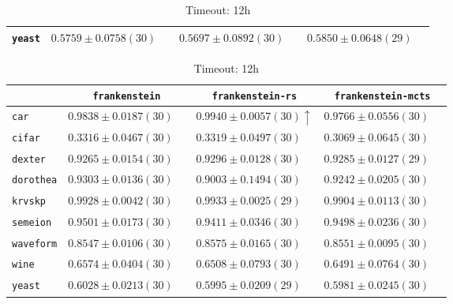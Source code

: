 \begin{table}[ht]
\begin{subtable}{\textwidth}
\begin{tabular}{l|ccc}
            \texttt{yeast} & $ 0.5759 \pm 0.0758 (30) \phantom{\downarrow}$ & $ 0.5697 \pm 0.0892 (30) \phantom{\downarrow}$ & $ \boldsymbol{0.5850} \pm 0.0648 (29) \phantom{\downarrow}$\\
            \hline
        \end{tabular}
    \end{subtable}
    \par\bigskip
    \begin{subtable}{\textwidth}
        \centering
        \caption{Timeout: 12h}
        \begin{tabular}{l|ccc}
            & \texttt{frankenstein}  & \texttt{frankenstein-rs}  & \texttt{frankenstein-mcts} \\
            \hline
            \texttt{car} & $ 0.9838 \pm 0.0187 (30) \phantom{\downarrow}$ & $ \boldsymbol{0.9940} \pm 0.0057 (30) \uparrow$ & $ 0.9766 \pm 0.0556 (30) \phantom{\downarrow}$\\
            \texttt{cifar} & $ 0.3316 \pm 0.0467 (30) \phantom{\downarrow}$ & $ \boldsymbol{0.3319} \pm 0.0497 (30) \phantom{\downarrow}$ & $ 0.3069 \pm 0.0645 (30) \phantom{\downarrow}$\\
            \texttt{dexter} & $ 0.9265 \pm 0.0154 (30) \phantom{\downarrow}$ & $ \boldsymbol{0.9296} \pm 0.0128 (30) \phantom{\downarrow}$ & $ 0.9285 \pm 0.0127 (29) \phantom{\downarrow}$\\
            \texttt{dorothea} & $ \boldsymbol{0.9303} \pm 0.0136 (30) \phantom{\downarrow}$ & $ 0.9003 \pm 0.1494 (30) \phantom{\downarrow}$ & $ 0.9242 \pm 0.0205 (30) \phantom{\downarrow}$\\
            \texttt{krvskp} & $ 0.9928 \pm 0.0042 (30) \phantom{\downarrow}$ & $ \boldsymbol{0.9933} \pm 0.0025 (29) \phantom{\downarrow}$ & $ 0.9904 \pm 0.0113 (30) \phantom{\downarrow}$\\
            \texttt{semeion} & $ \boldsymbol{0.9501} \pm 0.0173 (30) \phantom{\downarrow}$ & $ 0.9411 \pm 0.0346 (30) \phantom{\downarrow}$ & $ 0.9498 \pm 0.0236 (30) \phantom{\downarrow}$\\
            \texttt{waveform} & $ 0.8547 \pm 0.0106 (30) \phantom{\downarrow}$ & $ \boldsymbol{0.8575} \pm 0.0165 (30) \phantom{\downarrow}$ & $ 0.8551 \pm 0.0095 (30) \phantom{\downarrow}$\\
            \texttt{wine} & $ \boldsymbol{0.6574} \pm 0.0404 (30) \phantom{\downarrow}$ & $ 0.6508 \pm 0.0793 (30) \phantom{\downarrow}$ & $ 0.6491 \pm 0.0764 (30) \phantom{\downarrow}$\\
            \texttt{yeast} & $ \boldsymbol{0.6028} \pm 0.0213 (30) \phantom{\downarrow}$ & $ 0.5995 \pm 0.0209 (29) \phantom{\downarrow}$ & $ 0.5981 \pm 0.0245 (30) \phantom{\downarrow}$\\
            \hline
        \end{tabular}
    \end{subtable}
\end{table}

